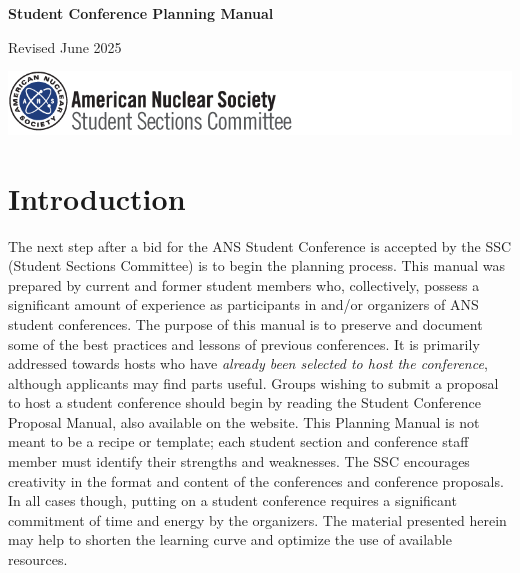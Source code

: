 \documentclass[12pt]{article}
\begin{document}
\begin{titlepage}
\vspace*{2cm}
\centering
{\Huge\bfseries Student Conference Planning Manual\par}

\vspace{2cm}
\rm{\Large Revised June 2025\par }

\vfill
\includegraphics[scale=0.75]{SSClogo.png}
\end{titlepage}

{\hypersetup{linkcolor=black}
\tableofcontents
}

\clearpage

\section{Introduction}

The next step after a bid for the ANS Student Conference is accepted by the SSC (Student Sections Committee) is to begin the planning process.
This manual was prepared by current and former student members who, collectively, possess a significant amount of experience as participants in and/or organizers of ANS student conferences.
The purpose of this manual is to preserve and document some of the best practices and lessons of previous conferences.
It is primarily addressed towards hosts who have \emph{already been selected to host the conference}, although applicants may find parts useful.
Groups wishing to submit a proposal to host a student conference should begin by reading the Student Conference Proposal Manual, also available on the website.
This Planning Manual is not meant to be a recipe or template; each student section and conference staff member must identify their strengths and weaknesses.
The SSC encourages creativity in the format and content of the conferences and conference proposals.
In all cases though, putting on a student conference requires a significant commitment of time and energy by the organizers.
The material presented herein may help to shorten the learning curve and optimize the use of available resources.
\end{document}
